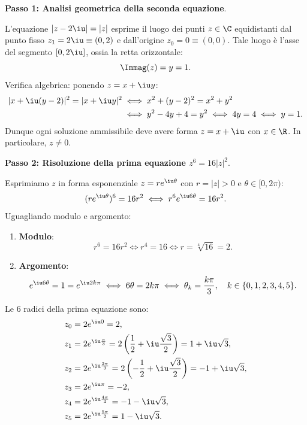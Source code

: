 \begin{dimostrazione}
\textbf{Passo 1: Analisi geometrica della seconda equazione}.

L'equazione $|z - 2\iu| = |z|$ esprime il luogo dei punti $z \in \C$ equidistanti dal punto fisso $z_1 = 2\iu \equiv (0, 2)$ e dall'origine $z_0 = 0 \equiv (0,0)$.
Tale luogo è l'asse del segmento $[0, 2\iu]$, ossia la retta orizzontale:
\begin{equation}
    \Immag(z) = y = 1.
\end{equation}
Verifica algebrica: ponendo $z = x + \iu y$:
\begin{align}
    |x + \iu(y - 2)|^2 = |x + \iu y|^2 &\iff x^2 + (y - 2)^2 = x^2 + y^2 \notag \\
    &\iff y^2 - 4y + 4 = y^2 \iff 4y = 4 \iff y = 1.
\end{align}
Dunque ogni soluzione ammissibile deve avere forma $z = x + \iu$ con $x \in \R$. In particolare, $z \neq 0$.

\textbf{Passo 2: Risoluzione della prima equazione $z^6 = 16|z|^2$}.

Esprimiamo $z$ in forma esponenziale $z = r e^{\iu\theta}$ con $r = |z| > 0$ e $\theta \in [0, 2\pi)$:
\begin{equation}
    (r e^{\iu\theta})^6 = 16 r^2 \iff r^6 e^{\iu 6\theta} = 16 r^2.
\end{equation}
Uguagliando modulo e argomento:
\begin{enumerate}
    \item \textbf{Modulo}:
    \begin{equation}
        r^6 = 16 r^2 \iff r^4 = 16 \iff r = \sqrt[4]{16} = 2.
    \end{equation}
    \item \textbf{Argomento}:
    \begin{equation}
        e^{\iu 6\theta} = 1 = e^{\iu 2k\pi} \iff 6\theta = 2k\pi \iff \theta_k = \frac{k\pi}{3}, \quad k \in \{0, 1, 2, 3, 4, 5\}.
    \end{equation}
\end{enumerate}
Le 6 radici della prima equazione sono:
\begin{align}
    z_0 &= 2 e^{\iu 0} = 2, \\
    z_1 &= 2 e^{\iu \frac{\pi}{3}} = 2\left(\frac{1}{2} + \iu\frac{\sqrt{3}}{2}\right) = 1 + \iu\sqrt{3}, \\
    z_2 &= 2 e^{\iu \frac{2\pi}{3}} = 2\left(-\frac{1}{2} + \iu\frac{\sqrt{3}}{2}\right) = -1 + \iu\sqrt{3}, \\
    z_3 &= 2 e^{\iu \pi} = -2, \\
    z_4 &= 2 e^{\iu \frac{4\pi}{3}} = -1 - \iu\sqrt{3}, \\
    z_5 &= 2 e^{\iu \frac{5\pi}{3}} = 1 - \iu\sqrt{3}.
\end{align}


\end{dimostrazione}
